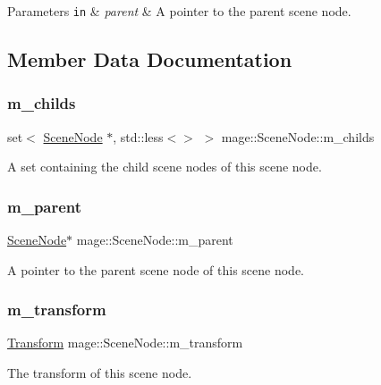 \begin{DoxyParams}[1]{Parameters}
\mbox{\tt in}  & {\em parent} & A pointer to the parent scene node. \\
\hline
\end{DoxyParams}


\subsection{Member Data Documentation}
\hypertarget{classmage_1_1_scene_node_afd031fb3c5ae4cef203fe8c85be0187e}{}\label{classmage_1_1_scene_node_afd031fb3c5ae4cef203fe8c85be0187e} 
\subsubsection{\texorpdfstring{m\+\_\+childs}{m\_childs}}
{\footnotesize\ttfamily set$<$ \hyperlink{classmage_1_1_scene_node}{Scene\+Node} $\ast$, std\+::less$<$$>$ $>$ mage\+::\+Scene\+Node\+::m\+\_\+childs\hspace{0.3cm}{\ttfamily [private]}}

A set containing the child scene nodes of this scene node. \hypertarget{classmage_1_1_scene_node_a507db45672f28f899f6c7b0f6a292202}{}\label{classmage_1_1_scene_node_a507db45672f28f899f6c7b0f6a292202} 
\subsubsection{\texorpdfstring{m\+\_\+parent}{m\_parent}}
{\footnotesize\ttfamily \hyperlink{classmage_1_1_scene_node}{Scene\+Node}$\ast$ mage\+::\+Scene\+Node\+::m\+\_\+parent\hspace{0.3cm}{\ttfamily [private]}}

A pointer to the parent scene node of this scene node. \hypertarget{classmage_1_1_scene_node_af1384e71b5cc527df881c7272e9fa518}{}\label{classmage_1_1_scene_node_af1384e71b5cc527df881c7272e9fa518} 
\subsubsection{\texorpdfstring{m\+\_\+transform}{m\_transform}}
{\footnotesize\ttfamily \hyperlink{structmage_1_1_transform}{Transform} mage\+::\+Scene\+Node\+::m\+\_\+transform\hspace{0.3cm}{\ttfamily [private]}}

The transform of this scene node. 